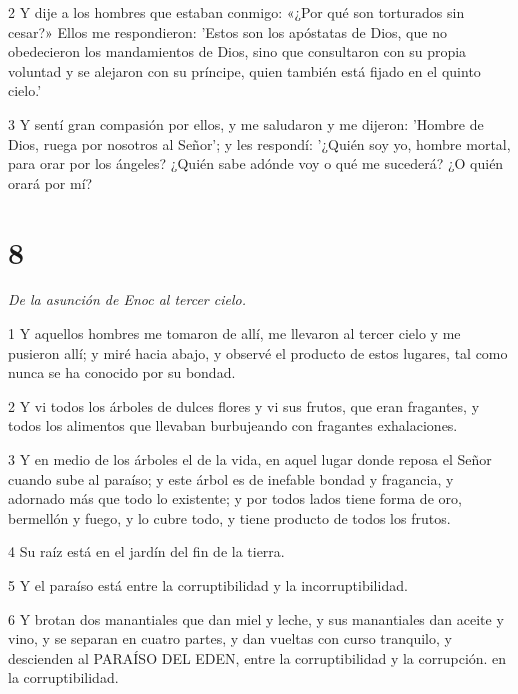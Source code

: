 \par 2 Y dije a los hombres que estaban conmigo: «¿Por qué son torturados sin cesar?» Ellos me respondieron: 'Estos son los apóstatas de Dios, que no obedecieron los mandamientos de Dios, sino que consultaron con su propia voluntad y se alejaron con su príncipe, quien también está fijado en el quinto cielo.'

\par 3 Y sentí gran compasión por ellos, y me saludaron y me dijeron: 'Hombre de Dios, ruega por nosotros al Señor'; y les respondí: '¿Quién soy yo, hombre mortal, para orar por los ángeles? ¿Quién sabe adónde voy o qué me sucederá? ¿O quién orará por mí?

\chapter{8}

\par \textit{De la asunción de Enoc al tercer cielo.}

\par 1 Y aquellos hombres me tomaron de allí, me llevaron al tercer cielo y me pusieron allí; y miré hacia abajo, y observé el producto de estos lugares, tal como nunca se ha conocido por su bondad.

\par 2 Y vi todos los árboles de dulces flores y vi sus frutos, que eran fragantes, y todos los alimentos que llevaban burbujeando con fragantes exhalaciones.

\par 3 Y en medio de los árboles el de la vida, en aquel lugar donde reposa el Señor cuando sube al paraíso; y este árbol es de inefable bondad y fragancia, y adornado más que todo lo existente; y por todos lados tiene forma de oro, bermellón y fuego, y lo cubre todo, y tiene producto de todos los frutos.

\par 4 Su raíz está en el jardín del fin de la tierra.

\par 5 Y el paraíso está entre la corruptibilidad y la incorruptibilidad.

\par 6 Y brotan dos manantiales que dan miel y leche, y sus manantiales dan aceite y vino, y se separan en cuatro partes, y dan vueltas con curso tranquilo, y descienden al PARAÍSO DEL EDEN, entre la corruptibilidad y la corrupción. en la corruptibilidad.

